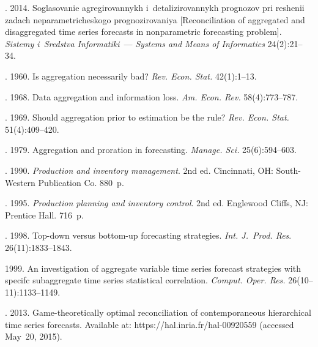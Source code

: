 \begin{multicols}{2}
{{\begin{thebibliography}{99}
. 2014. Soglasovanie agregirovannykh i~detalizirovannykh
prognozov pri re\-she\-nii zadach neparametricheskogo prognozirovaniya [Reconciliation
    of aggregated and disaggregated time series forecasts in nonparametric
    forecasting problem].
\textit{Sistemy i~Sredstva Informatiki}~--- \textit{Systems and Means of
    Informatics} 24(2):21--34.

.
1960. Is aggregation necessarily bad? \textit{Rev. Econ.
Stat.} 42(1):1--13.



.
1968. Data aggregation and information loss. \textit{Am. Econ. Rev.} 58(4):773--787.

. 1969.
Should aggregation prior to estimation be the rule? \textit{Rev. Econ. Stat.} 51(4):409--420.

   . 1979. Aggregation and proration
    in forecasting. \textit{Manage.
    Sci.} 25(6):594--603.

. 1990.
\textit{Production and inventory
    management}. 2nd ed. Cincinnati, OH: South-Western Publication Co. 880~p.

.
1995. \textit{Production planning and inventory
    control}. 2nd ed. Englewood Cliffs, NJ: Prentice Hall. 716~p.

.
1998. Top-down versus bottom-up forecasting
    strategies. \textit{Int. J.~Prod. Res}.
    26(11):1833--1843.

 1999. An investigation of aggregate variable time series forecast strategies with
    specifc subaggregate time series statistical correlation.
    \textit{Comput. Oper. Res.} 26(10--11):1133--1149.

    .
    2013. Game-theoretically optimal reconciliation of contemporaneous
    hierarchical time series forecasts.
    Available at: {\sf https://hal.inria.fr/hal-00920559}
    (accessed May~20, 2015).


\end{thebibliography}}}
\end{multicols}
